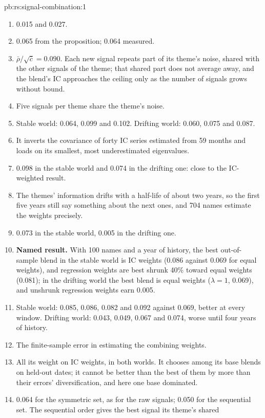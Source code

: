 \begin{solution}{pb:rs:signal-combination:1}
\begin{enumerate}
\item 0.015 and 0.027.
\item 0.065 from the proposition; 0.064 measured.
\item $\bar\rho/\sqrt{\bar c} = 0.090$. Each new signal repeats part of its theme's noise, shared with the other signals of the theme; that shared part does
not average away, and the blend's IC approaches the ceiling only as the number of signals grows without bound.
\item Five signals per theme share the theme's noise.
\item Stable world: 0.064, 0.099 and 0.102. Drifting world: 0.060, 0.075 and 0.087.
\item It inverts the covariance of forty IC series estimated from 59 months and loads on its smallest, most underestimated eigenvalues.
\item 0.098 in the stable world and 0.074 in the drifting one: close to the IC-weighted result.
\item The themes' information drifts with a half-life of about two years, so the first five years still say something about the next ones, and 704 names
estimate the weights precisely.
\item 0.073 in the stable world, 0.005 in the drifting one.
\item \textbf{Named result.} With 100 names and a year of history, the best out-of-sample blend in the stable world is IC weights (0.086 against 0.069
for equal weights), and regression weights are best shrunk 40\% toward equal weights (0.081); in the drifting world the best blend is equal weights
($\lambda = 1$, 0.069), and unshrunk regression weights earn 0.005.
\item Stable world: 0.085, 0.086, 0.082 and 0.092 against 0.069, better at every window. Drifting world: 0.043, 0.049, 0.067 and 0.074, worse until four
years of history.
\item The finite-sample error in estimating the combining weights.
\item All its weight on IC weights, in both worlds. It chooses among its base blends on held-out dates; it cannot be better than the best of them by more
than their errors' diversification, and here one base dominated.
\item 0.064 for the symmetric set, as for the raw signals; 0.050 for the sequential set. The sequential order gives the best signal its theme's shared

\end{enumerate}
\end{solution}
